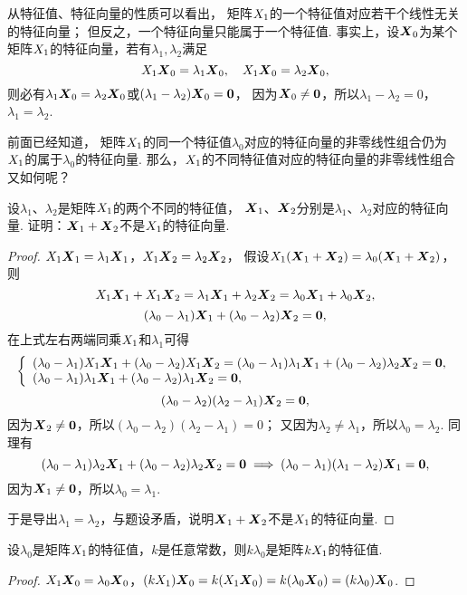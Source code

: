 从特征值、特征向量的性质可以看出，
矩阵\(X_1\)的一个特征值对应若干个线性无关的特征向量；
但反之，一个特征向量只能属于一个特征值.
事实上，设\(\boldsymbol{X}_0\)为某个矩阵\(X_1\)的特征向量，若有\(\lambda_1,\lambda_2\)满足\[
	X_1\boldsymbol{X}_0=\lambda_1\boldsymbol{X}_0,
	\quad
	X_1\boldsymbol{X}_0=\lambda_2\boldsymbol{X}_0,
\]
则必有\(\lambda_1\boldsymbol{X}_0=\lambda_2\boldsymbol{X}_0\)或\((\lambda_1-\lambda_2)\boldsymbol{X}_0=\boldsymbol{0}\)，
因为\(\boldsymbol{X}_0\neq\boldsymbol{0}\)，所以\(\lambda_1-\lambda_2=0\)，\(\lambda_1=\lambda_2\).

前面已经知道，
矩阵\(X_1\)的同一个特征值\(\lambda_0\)对应的特征向量的非零线性组合仍为\(X_1\)的属于\(\lambda_0\)的特征向量.
那么，\(X_1\)的不同特征值对应的特征向量的非零线性组合又如何呢？
\begin{example}
设\(\lambda_1\)、\(\lambda_2\)是矩阵\(X_1\)的两个不同的特征值，
\(\boldsymbol{X}_1\)、\(\boldsymbol{X}_2\)分别是\(\lambda_1\)、\(\lambda_2\)对应的特征向量.
证明：\(\boldsymbol{X}_1+\boldsymbol{X}_2\)不是\(X_1\)的特征向量.
\begin{proof}
\(X_1\boldsymbol{X}_1 = \lambda_1\boldsymbol{X}_1\)，\(X_1\boldsymbol{X}_2 = \lambda_2\boldsymbol{X}_2\)，
假设\(X_1(\boldsymbol{X}_1+\boldsymbol{X}_2) = \lambda_0(\boldsymbol{X}_1+\boldsymbol{X}_2)\)，则\[
	X_1\boldsymbol{X}_1+X_1\boldsymbol{X}_2 =\lambda_1\boldsymbol{X}_1+\lambda_2\boldsymbol{X}_2 = \lambda_0\boldsymbol{X}_1+\lambda_0\boldsymbol{X}_2,
\]\[
	(\lambda_0-\lambda_1)\boldsymbol{X}_1+(\lambda_0-\lambda_2)\boldsymbol{X}_2 = \boldsymbol{0},
\]
在上式左右两端同乘\(X_1\)和\(\lambda_1\)可得\[
	\left\{ \begin{array}{l}
		(\lambda_0-\lambda_1)X_1\boldsymbol{X}_1+(\lambda_0-\lambda_2)X_1\boldsymbol{X}_2 = (\lambda_0-\lambda_1)\lambda_1\boldsymbol{X}_1 + (\lambda_0-\lambda_2)\lambda_2\boldsymbol{X}_2 = \boldsymbol{0}, \\
		(\lambda_0-\lambda_1)\lambda_1\boldsymbol{X}_1+(\lambda_0-\lambda_2)\lambda_1\boldsymbol{X}_2 = \boldsymbol{0},
	\end{array} \right.
\]\[
	(\lambda_0-\lambda_2)(\lambda_2-\lambda_1)\boldsymbol{X}_2 = \boldsymbol{0},
\]
因为\(\boldsymbol{X}_2\neq\boldsymbol{0}\)，所以\((\lambda_0-\lambda_2)(\lambda_2-\lambda_1)=0\)；
又因为\(\lambda_2\neq\lambda_1\)，所以\(\lambda_0=\lambda_2\).
同理有\[
	(\lambda_0-\lambda_1)\lambda_2\boldsymbol{X}_1+(\lambda_0-\lambda_2)\lambda_2\boldsymbol{X}_2 = \boldsymbol{0}
	\implies
	(\lambda_0-\lambda_1)(\lambda_1-\lambda_2)\boldsymbol{X}_1 = \boldsymbol{0},
\]
因为\(\boldsymbol{X}_1\neq\boldsymbol{0}\)，所以\(\lambda_0=\lambda_1\).

于是导出\(\lambda_1=\lambda_2\)，与题设矛盾，说明\(\boldsymbol{X}_1+\boldsymbol{X}_2\)不是\(X_1\)的特征向量.
\end{proof}
\end{example}

\begin{example}
设\(\lambda_0\)是矩阵\(X_1\)的特征值，\(k\)是任意常数，则\(k\lambda_0\)是矩阵\(kX_1\)的特征值.
\begin{proof}
\(X_1\boldsymbol{X}_0=\lambda_0\boldsymbol{X}_0\)，\((kX_1)\boldsymbol{X}_0=k(X_1\boldsymbol{X}_0)=k(\lambda_0\boldsymbol{X}_0)=(k\lambda_0)\boldsymbol{X}_0\).
\end{proof}
\end{example}


